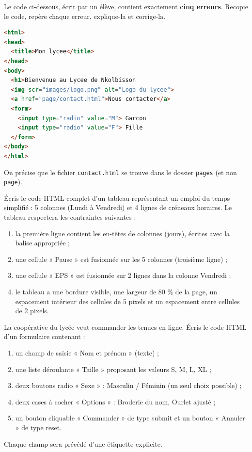 \documentclass[11pt]{article}
\newcounter{popsec}
\newcounter{popsub}
\newcommand{\courssub}[1]{%
  \stepcounter{popsub}%
  \par\vspace{9pt}\noindent{\popxbold\fontsize{11.5}{13}\selectfont\color{popink}{\color{poporange}\thepopsec.\thepopsub}\hspace{6pt}#1}\par\nopagebreak\vspace{4pt}
}
\begin{document}
\courssub{Je m'entraîne}

\begin{exercice}
Le code ci-dessous, écrit par un élève, contient exactement \textbf{cinq erreurs}. Recopie le code, repère chaque erreur, explique-la et corrige-la.
\begin{lstlisting}[language=HTML]
<html>
<head>
  <title>Mon lycee</title>
</head>
<body>
  <h1>Bienvenue au Lycee de Nkolbisson
  <img scr="images/logo.png" alt="Logo du lycee">
  <a href="page/contact.html">Nous contacter</a>
  <form>
    <input type="radio" value="M"> Garcon
    <input type="radio" value="F"> Fille
  </form>
</body>
</html>
\end{lstlisting}
On précise que le fichier \texttt{contact.html} se trouve dans le dossier \texttt{pages} (et non \texttt{page}).
\end{exercice}

\begin{exercice}
Écris le code HTML complet d'un tableau représentant un emploi du temps simplifié : 5 colonnes (Lundi à Vendredi) et 4 lignes de créneaux horaires. Le tableau respectera les contraintes suivantes :
\begin{enumerate}
\item la première ligne contient les en-têtes de colonnes (jours), écrites avec la balise appropriée ;
\item une cellule « Pause » est fusionnée sur les 5 colonnes (troisième ligne) ;
\item une cellule « EPS » est fusionnée sur 2 lignes dans la colonne Vendredi ;
\item le tableau a une bordure visible, une largeur de 80 \% de la page, un espacement intérieur des cellules de 5 pixels et un espacement entre cellules de 2 pixels.
\end{enumerate}
\end{exercice}

\begin{exercice}
La coopérative du lycée veut commander les tenues en ligne. Écris le code HTML d'un formulaire contenant :
\begin{enumerate}
\item un champ de saisie « Nom et prénom » (texte) ;
\item une liste déroulante « Taille » proposant les valeurs S, M, L, XL ;
\item deux boutons radio « Sexe » : Masculin / Féminin (un seul choix possible) ;
\item deux cases à cocher « Options » : Broderie du nom, Ourlet ajusté ;
\item un bouton cliquable « Commander » de type submit et un bouton « Annuler » de type reset.
\end{enumerate}
Chaque champ sera précédé d'une étiquette explicite.
\end{exercice}
\end{document}
